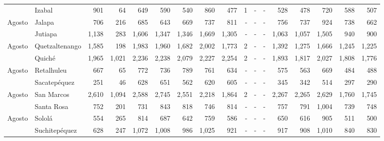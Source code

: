\begin{landscape}
\begin{center}
\begin{longtable}{llrrrrrrrrrrrrrrr}
\rowcolor{color1!5!white}\multicolumn{1}{l}{	\footnotesize	 Agosto 	}&	 Izabal 	&	 901 	&	 64 	&	 649 	&	 590 	&	 540 	&	 860 	&	 477 	&	 1 	&	 -   	&	 -   	&	 528 	&	 478 	&	 720 	&	 588 	&	 507 	\\
\multicolumn{1}{l}{	\footnotesize	 Agosto 	}&	 Jalapa 	&	 706 	&	 216 	&	 685 	&	 643 	&	 669 	&	 737 	&	 811 	&	 -   	&	 -   	&	 -   	&	 756 	&	 737 	&	 924 	&	 738 	&	 662 	\\
\rowcolor{color1!5!white}\multicolumn{1}{l}{	\footnotesize	 Agosto 	}&	 Jutiapa 	&	 1,138 	&	 283 	&	 1,606 	&	 1,347 	&	 1,346 	&	 1,669 	&	 1,305 	&	 -   	&	 -   	&	 -   	&	 1,063 	&	 1,057 	&	 1,505 	&	 940 	&	 900 	\\
\multicolumn{1}{l}{	\footnotesize	 Agosto 	}&	 Quetzaltenango 	&	 1,585 	&	 198 	&	 1,983 	&	 1,960 	&	 1,682 	&	 2,002 	&	 1,773 	&	 2 	&	 -   	&	 -   	&	 1,392 	&	 1,275 	&	 1,666 	&	 1,245 	&	 1,225 	\\
\rowcolor{color1!5!white}\multicolumn{1}{l}{	\footnotesize	 Agosto 	}&	 Quiché 	&	 1,965 	&	 1,021 	&	 2,236 	&	 2,238 	&	 2,079 	&	 2,227 	&	 2,254 	&	 2 	&	 -   	&	 -   	&	 1,893 	&	 1,817 	&	 2,027 	&	 1,808 	&	 1,776 	\\
\multicolumn{1}{l}{	\footnotesize	 Agosto 	}&	 Retalhuleu 	&	 667 	&	 65 	&	 772 	&	 736 	&	 789 	&	 761 	&	 634 	&	 -   	&	 -   	&	 -   	&	 575 	&	 563 	&	 669 	&	 484 	&	 488 	\\
\rowcolor{color1!5!white}\multicolumn{1}{l}{	\footnotesize	 Agosto 	}&	 Sacatepéquez 	&	 251 	&	 46 	&	 628 	&	 651 	&	 562 	&	 620 	&	 605 	&	 -   	&	 -   	&	 -   	&	 345 	&	 342 	&	 514 	&	 297 	&	 290 	\\
\multicolumn{1}{l}{	\footnotesize	 Agosto 	}&	 San Marcos 	&	 2,610 	&	 1,094 	&	 2,588 	&	 2,745 	&	 2,551 	&	 2,218 	&	 1,864 	&	 2 	&	 -   	&	 -   	&	 2,267 	&	 2,265 	&	 2,629 	&	 1,760 	&	 1,745 	\\
\rowcolor{color1!5!white}\multicolumn{1}{l}{	\footnotesize	 Agosto 	}&	 Santa Rosa 	&	 752 	&	 201 	&	 731 	&	 843 	&	 818 	&	 746 	&	 814 	&	 -   	&	 -   	&	 -   	&	 757 	&	 791 	&	 1,004 	&	 739 	&	 748 	\\
\multicolumn{1}{l}{	\footnotesize	 Agosto 	}&	 Sololá 	&	 554 	&	 265 	&	 814 	&	 687 	&	 642 	&	 759 	&	 586 	&	 -   	&	 -   	&	 -   	&	 650 	&	 616 	&	 905 	&	 511 	&	 500 	\\
\rowcolor{color1!5!white}\multicolumn{1}{l}{	\footnotesize	 Agosto 	}&	 Suchitepéquez 	&	 628 	&	 247 	&	 1,072 	&	 1,008 	&	 986 	&	 1,025 	&	 921 	&	 -   	&	 -   	&	 -   	&	 917 	&	 908 	&	 1,010 	&	 840 	&	 830 	\\

\end{longtable}
\end{center}
\end{landscape}
